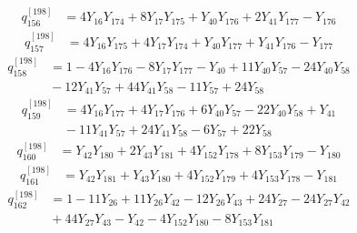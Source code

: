 \begin{equation}\label{q198:row:156}
\begin{aligned}
q_{156}^{[198]} &={} 4Y_{16}Y_{174} + 8Y_{17}Y_{175} + Y_{40}Y_{176} + 2Y_{41}Y_{177} - Y_{176}
\end{aligned}
\end{equation}
\begin{equation}\label{q198:row:157}
\begin{aligned}
q_{157}^{[198]} &={} 4Y_{16}Y_{175} + 4Y_{17}Y_{174} + Y_{40}Y_{177} + Y_{41}Y_{176} - Y_{177}
\end{aligned}
\end{equation}
\begin{equation}\label{q198:row:158}
\begin{aligned}
q_{158}^{[198]} &={} 1 - 4Y_{16}Y_{176} - 8Y_{17}Y_{177} - Y_{40} + 11Y_{40}Y_{57} - 24Y_{40}Y_{58}\\
&{} - 12Y_{41}Y_{57} + 44Y_{41}Y_{58} - 11Y_{57} + 24Y_{58}
\end{aligned}
\end{equation}
\begin{equation}\label{q198:row:159}
\begin{aligned}
q_{159}^{[198]} &={} 4Y_{16}Y_{177} + 4Y_{17}Y_{176} + 6Y_{40}Y_{57} - 22Y_{40}Y_{58} + Y_{41}\\
&{} - 11Y_{41}Y_{57} + 24Y_{41}Y_{58} - 6Y_{57} + 22Y_{58}
\end{aligned}
\end{equation}
\begin{equation}\label{q198:row:160}
\begin{aligned}
q_{160}^{[198]} &={} Y_{42}Y_{180} + 2Y_{43}Y_{181} + 4Y_{152}Y_{178} + 8Y_{153}Y_{179} - Y_{180}
\end{aligned}
\end{equation}
\begin{equation}\label{q198:row:161}
\begin{aligned}
q_{161}^{[198]} &={} Y_{42}Y_{181} + Y_{43}Y_{180} + 4Y_{152}Y_{179} + 4Y_{153}Y_{178} - Y_{181}
\end{aligned}
\end{equation}
\begin{equation}\label{q198:row:162}
\begin{aligned}
q_{162}^{[198]} &={} 1 - 11Y_{26} + 11Y_{26}Y_{42} - 12Y_{26}Y_{43} + 24Y_{27} - 24Y_{27}Y_{42}\\
&{} + 44Y_{27}Y_{43} - Y_{42} - 4Y_{152}Y_{180} - 8Y_{153}Y_{181}
\end{aligned}
\end{equation}
